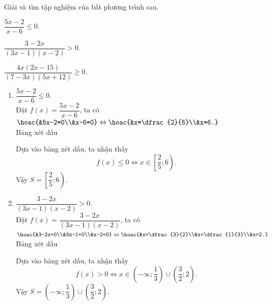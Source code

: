 \begin{bt}%
	Giải và tìm tập nghiệm của bất phương trình sau.
	\begin{listEX}[1]
		\item $\dfrac{5x-2}{x-6}\le 0$.
		\item $\dfrac{3-2x}{(3x-1)(x-2)}>0$.
		\item $\dfrac{4x(2x-15)}{(7-3x)(5x+12)}\ge 0$.
	\end{listEX}
	\loigiai 
	{
		\begin{enumerate}
			\item $\dfrac{5x-2}{x-6}\le 0$.\\
			Đặt $f(x)=\dfrac{5x-2}{x-6}$, ta có $\hoac{&5x-2=0\\&x-6=0}\Leftrightarrow \hoac{&x=\dfrac{2}{5}\\&x=6.}$\\
			Bảng xét dấu
			\begin{center}
			\end{center} 
			Dựa vào bảng xét dấu, ta nhận thấy
			$$f(x)\le 0 \Leftrightarrow x\in  \left[\dfrac{2}{5};6\right). $$
			Vậy $S=\left[\dfrac{2}{5};6\right). $
			
			\item $\dfrac{3-2x}{(3x-1)(x-2)}>0$.\\
			Đặt $f(x)=\dfrac{3-2x}{(3x-1)(x-2)}$, ta có $\hoac{&3-2x=0\\&3x-1=0\\&x-2=0}\Leftrightarrow \hoac{&x=\dfrac{3}{2}\\&x=\dfrac{1}{3}\\&x=2.}$\\
			Bảng xét dấu
			\begin{center}
			\end{center}
			Dựa vào bảng xét dấu, ta nhận thấy
			$$f(x)>0 \Leftrightarrow x\in \left(-\infty;\dfrac{1}{3}\right)\cup \left(\dfrac{3}{2};2\right).$$
			Vậy $S=\left(-\infty;\dfrac{1}{3}\right)\cup \left(\dfrac{3}{2};2\right).$
			

\end{enumerate}}
\end{bt}
